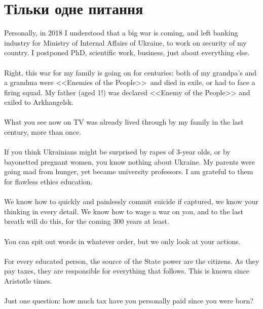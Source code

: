 \section{Тільки одне питання}

Personally, in 2018 I understood that a big war is coming, and left banking
industry for Ministry of Internal Affairs of Ukraine, to work on security
of my country. I postponed PhD, scientific work, business, just about everything else.
\\
\\
Right, this war for my family is going on for centuries: both of my
grandpa's and a grandma were <<Enemies of the People>>\, and died in exile,
or had to face a firing squad. My father (aged 1!) was
declared <<Enemy of the People>> and exiled to Arkhangelsk.
\\
\\
What you see now on TV was already lived through by my family in the
last century, more than once.
\\
\\
If you think Ukrainians might be surprised by rapes of 3-year olds,
or by bayonetted pregnant women, you know nothing about Ukraine.
My parents were going mad from hunger, yet became university professors.
I am grateful to them for flawless ethics education.
\\
\\
We know how to quickly and painlessly commit suicide if captured, we know
your thinking in every detail. We know how to wage a war on you, and to
the last breath will do this, for the coming 300 years at least.
\\
\\
You can spit out words in whatever order, but we only look at your actions.
\\
\\
For every educated person, the source of the State power are the citizens.
As they pay taxes, they are responsible for everything that follows.
This is known since Aristotle times.
\\
\\
Just one question: how much tax have you personally paid since you were born?

\normalsize

